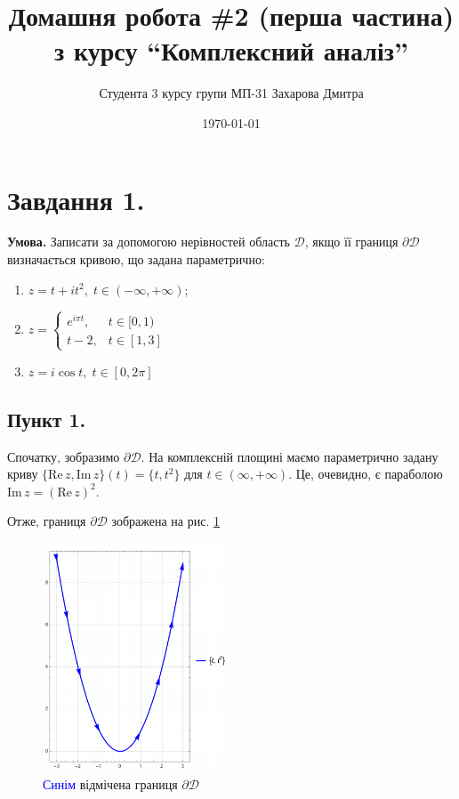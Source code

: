 \documentclass[14pt]{extarticle}
\title{Домашня робота \#2 (перша частина) з курсу ``Комплексний аналіз''}
\author{Студента 3 курсу групи МП-31 Захарова Дмитра}
\date{\today}
\begin{document}
\maketitle

\section*{Завдання 1.}

\textbf{Умова.} Записати за допомогою нерівностей область $\mathcal{D}$, якщо її границя $\partial \mathcal{D}$ визначається кривою, що задана параметрично:
\begin{enumerate}
    \item $z = t + it^2, \; t \in (-\infty,+\infty)$;
    \item $z = \begin{cases}
        e^{i\pi t}, & t \in [0,1) \\
        t-2, & t \in [1,3]
    \end{cases}$
    \item $z=i \cos t, \; t \in [0,2\pi]$
\end{enumerate}

\subsection*{Пункт 1.}

Спочатку, зобразимо $\partial\mathcal{D}$. На комплексній площині маємо параметрично задану криву $\{\text{Re}\,z,\text{Im}\,z\}(t)=\{t,t^2\}$ для $t \in (\infty,+\infty)$. Це, очевидно, є параболою $\text{Im}\,z = (\text{Re}\, z)^2$. 

Отже, границя $\partial\mathcal{D}$ зображена на рис. \ref{fig:1_1_1}

\begin{figure}[H]
    \centering
    \includegraphics[width=0.5\textwidth]{images/hw_2/hw_2_1_1(1).png}
    \caption{\textcolor{blue}{Синім} відмічена границя $\partial\mathcal{D}$}
    \label{fig:1_1_1}
\end{figure}
\end{document}
